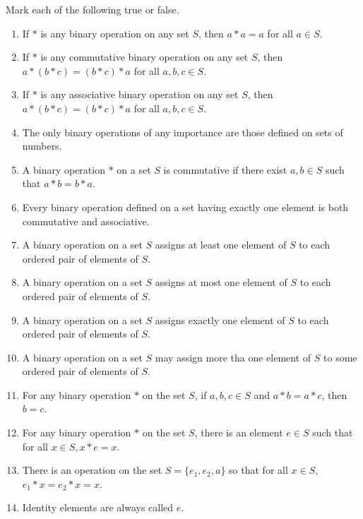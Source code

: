 \newpage
\begin{exercise}
    Mark each of the following true or false.
    \begin{enumerate}[label={\textbf{\alph*.}},itemsep=0pt,topsep=0pt]
        \item If $*$ is any binary operation on any set $S$, then $a * a = a$ for all $a\in S$.
        \item If $*$ is any commutative binary operation on any set $S$, then $a * (b * c) = (b * c) * a$ for all $a, b, c \in S$.
        \item If $*$ is any associative binary operation on any set $S$, then $a * (b * c) = (b * c) * a$ for all $a, b, c \in S$.
        \item The only binary operations of any importance are those defined on sets of numbers.
        \item A binary operation $*$ on a set $S$ is commutative if there exist $a, b \in S$ such that $a * b = b * a$.
        \item Every binary operation defined on a set having exactly one element is both commutative and associative.
        \item A binary operation on a set $S$ assigns at least one element of $S$ to each ordered pair of elements of $S$.
        \item A binary operation on a set $S$ assigns at most one element of $S$ to each ordered pair of elements of $S$.
        \item A binary operation on a set $S$ assigns exactly one element of $S$ to each ordered pair of elements of $S$.
        \item A binary operation on a set $S$ may assign more tha one element of $S$ to some ordered pair of elements of $S$.
        \item For any binary operation $*$ on the set $S$, if $a, b, c\in S$ and $a * b = a * c$, then $b = c$.
        \item For any binary operation $*$ on the set $S$, there is an element $e\in S$ such that for all $x\in S, x * e = x$.
        \item There is an operation on the set $S = \{ e_{1}, e_{2}, a \}$ so that for all $x\in S$, $e_{1} * x = e_{2} * x = x$.
        \item Identity elements are always called $e$.
    \end{enumerate}
\end{exercise}

